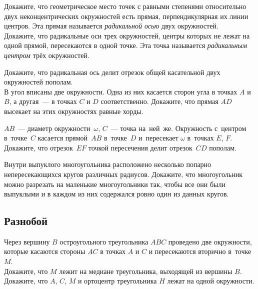 \begin{problems}

\item
\spx{$^\circ$}
Докажите, что геометрическое место точек с равными степенями относительно двух
неконцентрических окружностей есть прямая, перпендикулярная их линии центров.
Эта прямая называется \emph{радикальной осью} двух окружностей.
\\
\spx{$^\circ$}
Докажите, что радикальные оси трех окружностей, центры которых не лежат на
одной прямой, пересекаются в одной точке.
Эта точка называется \emph{радикальным центром} трёх окружностей.

\else %


\begin{problems}

\fi %

\item
\sp
Докажите, что радикальная ось делит отрезок общей касательной двух окружностей
пополам.
\\
\sp
В угол вписаны две окружности.
Одна из них касается сторон угла в точках $A$ и $B$, а другая~--- в точках $C$
и $D$ соответственно.
Докажите, что прямая $AD$ высекает на этих окружностях равные хорды.

\item
$AB$~--- диаметр окружности~$\omega$, $C$~--- точка на~ней~же.
Окружность с~центром в~точке~$C$ касается прямой~$AB$ в~точке~$D$ и~пересекает
$\omega$ в~точках $E$, $F$.
Докажите, что отрезок~$EF$ точкой пересечения делит отрезок~$CD$ пополам.

\item
Внутри выпуклого многоугольника расположено несколько попарно непересекающихся
кругов различных радиусов.
Докажите, что многоугольник можно разрезать на маленькие многоугольники так,
чтобы все они были выпуклыми и в каждом из них содержался ровно один из данных
кругов.

\end{problems}


\subsection*{Разнобой}

\begin{problems}

\item
Через вершину $B$ остроугольного треугольника $ABC$ проведено две окружности,
которые касаются стороны $AC$ в точках $A$ и $C$ и пересекаются вторично
в~точке~$M$.
\\
\sp
Докажите, что $M$ лежит на медиане треугольника, выходящей из вершины $B$.
\\
\sp
Докажите, что $A$, $C$, $M$ и ортоцентр треугольника $H$ лежат на одной
окружности.


\end{problems}
\end{problems}
